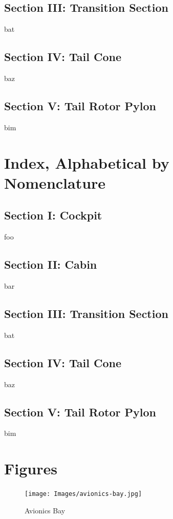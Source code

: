 \documentclass[letterpaper,11pt,openany,oneside]{book}
\begin{document}
\section*{Section III: Transition Section}
bat
\section*{Section IV: Tail Cone}
baz
\section*{Section V: Tail Rotor Pylon}
bim
\chapter*{Index, Alphabetical by Nomenclature}
\section*{Section I: Cockpit}
foo
\section*{Section II: Cabin}
bar
\section*{Section III: Transition Section}
bat
\section*{Section IV: Tail Cone}
baz
\section*{Section V: Tail Rotor Pylon}
bim
\chapter*{Figures}
\begin{figure}[htp]
	\texttt{[image: Images/avionics-bay.jpg]}
	\caption{Avionics Bay} \label{avionics}
\end{figure}
\end{document}
